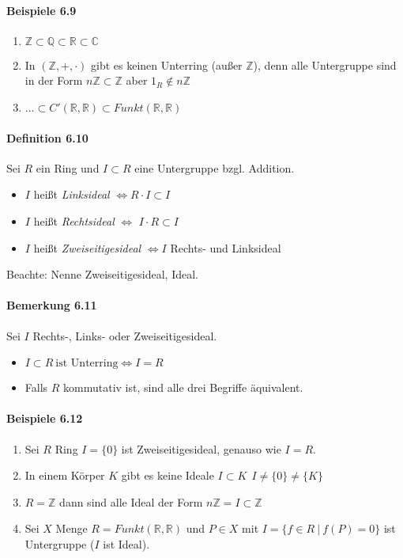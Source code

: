 \documentclass{scrartcl}
\begin{document}
\paragraph{Beispiele 6.9}
\begin{enumerate}
\item $\mathbb{Z} \subset \mathbb{Q} \subset \mathbb{R} \subset \mathbb{C}$
\item In $(\mathbb{Z}, +, \cdot)$ gibt es keinen Unterring (außer $\mathbb{Z}$),
  denn alle  Untergruppe sind in der Form $n \mathbb{Z} \subset \mathbb{Z}$ aber
  $1_R \notin n \mathbb{Z}$
\item $\dots \subset C'(\mathbb{R}, \mathbb{R}) \subset Funkt(\mathbb{R},
  \mathbb{R})$
\end{enumerate}

\paragraph{Definition 6.10}
Sei $R$ ein Ring und $I \subset R$ eine Untergruppe bzgl. Addition.
\begin{itemize}
\item $I$ heißt \textit{Linksideal} $\Leftrightarrow R \cdot I \subset I$
\item $I$ heißt \textit{Rechtsideal} $\Leftrightarrow$ $I \cdot R \subset I$
\item $I$ heißt \textit{Zweiseitigesideal} $\Leftrightarrow I$ Rechts- und
  Linksideal
\end{itemize}
Beachte: Nenne Zweiseitigesideal, Ideal.

\paragraph{Bemerkung 6.11}
Sei $I$ Rechts-, Links- oder Zweiseitigesideal.
\begin{itemize}
\item $I \subset R ~\text{ist Unterring} \Leftrightarrow I = R$
\item Falls $R$ kommutativ ist, sind alle drei Begriffe äquivalent.
\end{itemize}

\paragraph{Beispiele 6.12}
\begin{enumerate}
\item Sei $R$ Ring $I = \{ 0 \}$ ist Zweiseitigesideal, genauso wie $I = R$.
\item In einem Körper $K$ gibt es keine Ideale $I \subset K~~I \neq \{ 0 \} \neq
  \{ K \}$
\item $R = \mathbb{Z}$ dann sind alle Ideal der Form $n \mathbb{Z} = I \subset
  \mathbb{Z}$
\item Sei $X$ Menge $R = Funkt(\mathbb{R}, \mathbb{R})$ und $P \in X$ mit $I =
  \{ f \in R ~|~ f(P) = 0\}$ ist Untergruppe ($I$ ist Ideal).
\end{enumerate}
\end{document}
